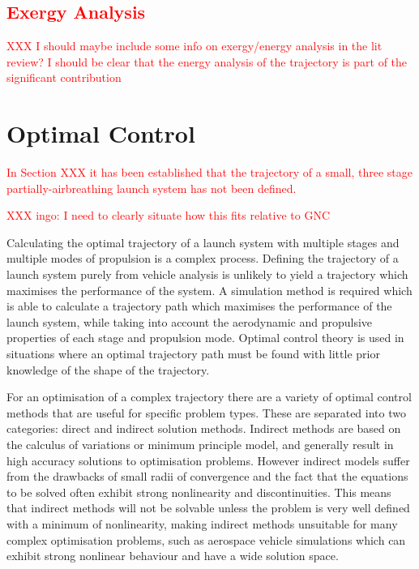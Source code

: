 \textcolor{red}{
	\subsection{Exergy Analysis}
}
\textcolor{red}{XXX I should maybe include some info on exergy/energy analysis in the lit review? I should be clear that the energy analysis of the trajectory is part of the significant contribution }


\section{Optimal Control}\label{sec:Optimisation}
\textcolor{red}{In Section XXX it has been established that the trajectory of a small, three stage partially-airbreathing launch system has not been defined.}

\textcolor{red}{XXX ingo: I need to clearly situate how this fits relative to GNC}

Calculating the optimal trajectory of a launch system with multiple stages and multiple modes of propulsion is a complex process. 
Defining the trajectory of a launch system purely from vehicle analysis is unlikely to yield a trajectory which maximises the performance of the system.
A simulation method is required which is able to calculate a trajectory path which maximises the performance of the launch system, while taking into account the aerodynamic and propulsive properties of each stage and propulsion mode. 
Optimal control theory is used in situations where an optimal trajectory path must be found with little prior knowledge of the shape of the trajectory. 

For an optimisation of a complex trajectory there are a variety of optimal control methods that are useful for specific problem types. These are separated into two categories: direct and indirect solution methods. Indirect methods are based on the calculus of variations or minimum principle model, and generally result in high accuracy solutions to optimisation problems\cite{Bulirsch1993}. However indirect models suffer from the drawbacks of small radii of convergence and the fact that the equations to be solved often exhibit strong nonlinearity and discontinuities. This means that indirect methods will not be solvable unless the problem is very well defined with a minimum of nonlinearity, making indirect methods unsuitable for many complex optimisation problems, such as aerospace vehicle simulations which can exhibit strong nonlinear behaviour and have a wide solution space. 

